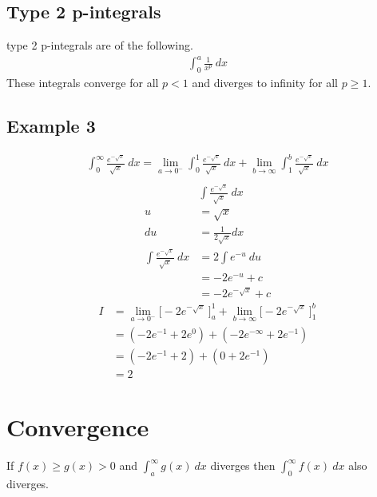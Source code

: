 \documentclass{article}
\theoremstyle{mytheoremstyle}
\theoremstyle{mytheoremstyle}
\theoremstyle{myproblemstyle}
\begin{document}
    \subsection*{Type 2 p-integrals}
    type 2 p-integrals are of the following.
    \begin{align*}
        \int_{0}^{a} \frac{1}{x^p} \ dx
    \end{align*}
    These integrals converge for all $p<1$ and diverges to infinity for all
    $p\ge 1$.

    \subsection*{Example 3}
    \begin{align*}
        \int_{0}^{\infty} \frac{e^{-\sqrt{x}}}{\sqrt{x}} \ dx
        = \lim_{a\to 0^-} \int_{0}^{1} \frac{e^{-\sqrt{x}}}{\sqrt{x}} \ dx
        + \lim_{b\to \infty} \int_{1}^{b} \frac{e^{-\sqrt{x}}}{\sqrt{x}} \ dx \\
    \end{align*}
    \begin{align*}
        &\int \frac{e^{-\sqrt{x}}}{\sqrt{x}} \ dx \\
        u &= \sqrt{x} \\
        du &= \frac{1}{2\sqrt{x}} dx \\
        \int \frac{e^{-\sqrt{x}}}{\sqrt{x}} \ dx
        &= 2\int e^{-u} \ du \\
        &= -2e^{-u} + c \\
        &= -2e^{-\sqrt{x}} + c
    \end{align*}
    \begin{align*}
        I &= \lim_{a\to 0^-} \Big[-2e^{-\sqrt{x}} \ \Big]_{a}^{1}
        + \lim_{b\to \infty} \Big[-2e^{-\sqrt{x}} \ \Big]_{1}^{b} \\
          &= (-2e^{-1} + 2e^0) + (-2e^{-\infty} + 2e^{-1}) \\
          &= (-2e^{-1} + 2) + (0 + 2e^{-1}) \\
          &= 2
    \end{align*}

    \section*{Convergence}
    If $f(x) \ge g(x) > 0$ and $\int_{a}^{\infty} g(x) \ dx$ diverges then
    $\int_{0}^{\infty} f(x) \ dx$ also diverges.
\end{document}
